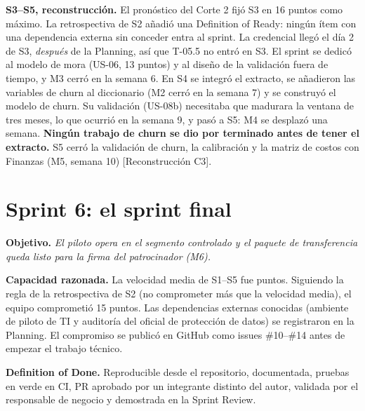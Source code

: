 \documentclass[10pt,a4paper]{article}
\newcommand{\rot}[1]{\textsf{\scriptsize\color{gris}[#1]}}
\begin{document}
\textbf{S3--S5, reconstrucción.} El pronóstico del Corte 2 fijó S3 en 16 puntos como máximo. La retrospectiva de S2 añadió una Definition of Ready: ningún ítem con una dependencia externa sin conceder entra al sprint. La credencial llegó el día 2 de S3, \emph{después} de la Planning, así que T-05.5 no entró en S3. El sprint se dedicó al modelo de mora (US-06, 13 puntos) y al diseño de la validación fuera de tiempo, y M3 cerró en la semana 6. En S4 se integró el extracto, se añadieron las variables de churn al diccionario (M2 cerró en la semana 7) y se construyó el modelo de churn. Su validación (US-08b) necesitaba que madurara la ventana de tres meses, lo que ocurrió en la semana 9, y pasó a S5: M4 se desplazó una semana. \textbf{Ningún trabajo de churn se dio por terminado antes de tener el extracto.} S5 cerró la validación de churn, la calibración y la matriz de costos con Finanzas (M5, semana 10) \rot{Reconstrucción C3}.

\begin{table}[h]
\caption{Backlog de S3--S5 y su vínculo con objetivos e hitos}\label{tab:trace}

\end{table}

\section{Sprint 6: el sprint final}

\textbf{Objetivo.} \emph{El piloto opera en el segmento controlado y el paquete de transferencia queda listo para la firma del patrocinador (M6).}

\textbf{Capacidad razonada.} La velocidad media de S1--S5 fue \VelMedia{} puntos. Siguiendo la regla de la retrospectiva de S2 (no comprometer más que la velocidad media), el equipo comprometió 15 puntos. Las dependencias externas conocidas (ambiente de piloto de TI y auditoría del oficial de protección de datos) se registraron en la Planning. El compromiso se publicó en GitHub como issues \#10--\#14 antes de empezar el trabajo técnico.

\begin{table}[h]
\caption{Sprint Backlog de S6 (cada historia tiene criterios Dado/Cuando/Entonces y DoD en su issue)}\label{tab:s6}

\end{table}

\textbf{Definition of Done.} Reproducible desde el repositorio, documentada, pruebas en verde en CI, PR aprobado por un integrante distinto del autor, validada por el responsable de negocio y demostrada en la Sprint Review.
\end{document}
